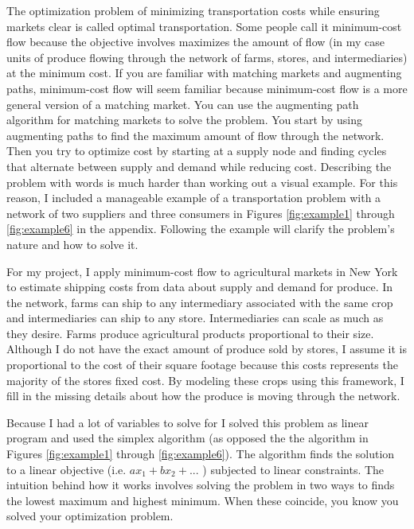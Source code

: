 \documentclass{report}
\begin{document}
The optimization problem of minimizing transportation costs while ensuring markets clear is called optimal transportation. Some people call it minimum-cost flow because the objective involves maximizes the amount of flow (in my case units of produce flowing through the network of farms, stores, and intermediaries) at the minimum cost. If you are familiar with matching markets and augmenting paths, minimum-cost flow will seem familiar because minimum-cost flow is a more general version of a matching market. You can use the augmenting path algorithm for matching markets to solve the problem. You start by using augmenting paths to find the maximum amount of flow through the network. Then you try to optimize cost by starting at a supply node and finding cycles that alternate between supply and demand while reducing cost. Describing the problem with words is much harder than working out a visual example. For this reason, I included a manageable example of a transportation problem with a network of two suppliers and three consumers in Figures \ref{fig:example1} through \ref{fig:example6} in the appendix. Following the example will clarify the problem's nature and how to solve it.

For my project, I apply minimum-cost flow to agricultural markets in New York to estimate shipping costs from data about supply and demand for produce. In the network, farms can ship to any intermediary associated with the same crop and intermediaries can ship to any store. Intermediaries can scale as much as they desire. Farms produce agricultural products proportional to their size. Although I do not have the exact amount of produce sold by stores, I assume it is proportional to the cost of their square footage because this costs represents the majority of the stores fixed cost. By modeling these crops using this framework, I fill in the missing details about how the produce is moving through the network.

Because I had a lot of variables to solve for I solved this problem as linear program and used the simplex algorithm (as opposed the the algorithm in Figures \ref{fig:example1} through \ref{fig:example6}). The algorithm finds the solution to a linear objective (i.e. $a x_1 +b x_2 + ...$ ) subjected to linear constraints. The intuition behind how it works involves solving the problem in two ways to finds the lowest maximum and highest minimum. When these coincide, you know you solved your optimization problem.
\end{document}
